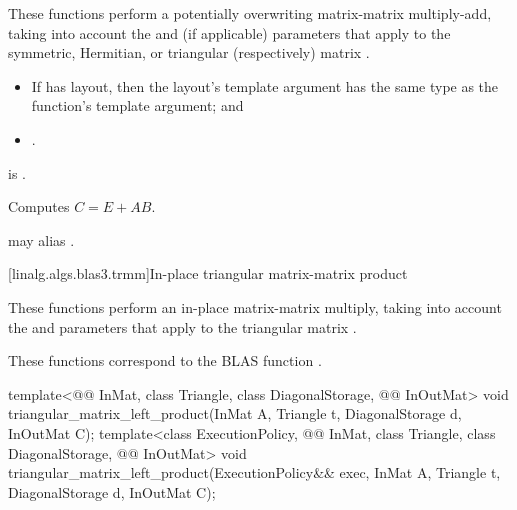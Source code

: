 \begin{itemdescr}
\pnum
These functions perform
a potentially overwriting matrix-matrix multiply-add,
taking into account
the  and  (if applicable) parameters
that apply to the symmetric, Hermitian, or triangular (respectively) matrix .

\pnum
\mandates
\begin{itemize}
\item
If  has  layout,
then the layout's  template argument has
the same type as the function's  template argument; and
\item
{}.
\end{itemize}

\pnum
\expects
{} is .

\pnum
\effects
Computes $C = E + A B$.

\pnum
\remarks
{} may alias .
\end{itemdescr}

[linalg.algs.blas3.trmm]{In-place triangular matrix-matrix product}

\pnum
These functions perform
an in-place matrix-matrix multiply,
taking into account
the  and  parameters
that apply to the triangular matrix .
\begin{note}
These functions correspond to the BLAS function \supercite{blas3}.
\end{note}

\begin{itemdecl}
template<@@ InMat, class Triangle, class DiagonalStorage, @@ InOutMat>
  void triangular_matrix_left_product(InMat A, Triangle t, DiagonalStorage d, InOutMat C);
template<class ExecutionPolicy,
         @@ InMat, class Triangle, class DiagonalStorage, @@ InOutMat>
  void triangular_matrix_left_product(ExecutionPolicy&& exec,
                                      InMat A, Triangle t, DiagonalStorage d, InOutMat C);
\end{itemdecl}

